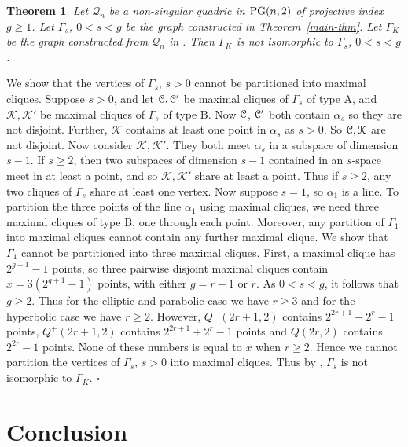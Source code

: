 \documentclass[12pt]{article}
\newtheorem{theorem}{Theorem}[section]
\newenvironment{proof}{\noindent{\bf Proof}\hspace{0.5em}}
    { \null  \hfill $\square$ \par}
\newcommand\C{{\cal C}}
\newcommand{\K}{\mathcal K}
\newcommand{\Q}{\mathscr Q}
\newcommand\PG{{\rm PG}}
\begin{document}
\begin{theorem} Let $\Q_n$ be a non-singular quadric in $\PG(n,2)$ of projective index $g\geq1$. Let $\Gamma_s$, $0<s<g$ be the graph constructed in Theorem~\ref{main-thm}. Let $\Gamma_K$ be the graph constructed from $\Q_n$ in \cite{kantor}. Then $\Gamma_K$ is not isomorphic to $\Gamma_s$, $0<s<g$. \end{theorem}
\begin{proof} We show that the vertices of $\Gamma_s$, $s>0$ cannot be partitioned into maximal cliques. 
Suppose $s>0$, and let $\C,\C'$ be maximal cliques of $\Gamma_s$ of type A, and $\K,\K'$ be maximal cliques of $\Gamma_s$ of type B. Now $\C$, $\C'$ both contain $\alpha_s$ so they are not disjoint. Further, $\K$ contains at least one point in $\alpha_s$ as $s>0$. So $\C,\K$ are not disjoint. Now consider $\K,\K'$. They both meet $\alpha_s$ in a subspace of dimension $s-1$. If $s\geq 2$, then two subspaces of dimension $s-1$ contained in an $s$-space meet in at least a point,  and so $\K,\K'$ share at least a point.  Thus if $s\geq 2$, any two cliques of $\Gamma_s$ share at least one vertex.
Now suppose $s=1$, so $\alpha_1$ is a line. To partition the three points of the line $\alpha_1$ using maximal cliques, we need three maximal cliques of type B, one through each point. Moreover, any partition of $\Gamma_1$ into maximal cliques cannot contain any further maximal clique.  We show that $\Gamma_1$ cannot be partitioned into three maximal cliques. First, a maximal clique has $2^{g+1}-1$ points, so three pairwise disjoint maximal cliques contain $x=3(2^{g+1}-1)$ points, with either $g=r-1$ or $r$. 
As $0<s<g$, it follows that $g\ge2$. Thus for the elliptic and parabolic case we have $r\ge 3$ and for the hyperbolic case we have $r\ge 2$. 
However, $Q^-(2r+1,2)$ contains $2^{2r+1}-2^r-1$ points, $Q^+(2r+1,2)$ contains $2^{2r+1}+2^r-1$ points and $Q(2r,2)$ contains $2^{2r}-1$ points. 
None of these numbers is equal to $x$ when $r\ge 2$. Hence we cannot partition 
 the vertices of $\Gamma_s$, $s>0$ into maximal cliques. 
Thus by \cite[Lemma 3.3]{kantor}, $\Gamma_s$ is not isomorphic to $\Gamma_K$. 
\end{proof}


\section{Conclusion}
\end{document}
